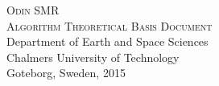 \thispagestyle{empty}
\begin{center}
\large
\LARGE
\textsc{Odin SMR \\ Algorithm Theoretical Basis Document}\\[20mm]
\LARGE
\large
Department of Earth and Space Sciences\\
Chalmers University of Technology\\
Goteborg, Sweden, 2015
\end{center}
